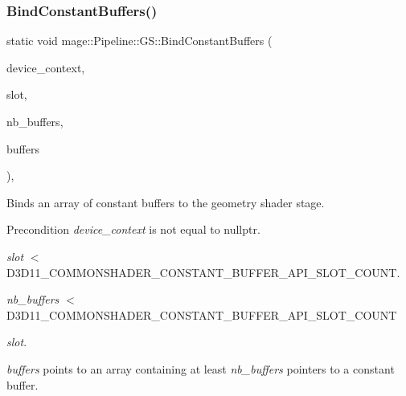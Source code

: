 \subsubsection{\texorpdfstring{Bind\+Constant\+Buffers()}{BindConstantBuffers()}}
{\footnotesize\ttfamily static void mage\+::\+Pipeline\+::\+G\+S\+::\+Bind\+Constant\+Buffers (\begin{DoxyParamCaption}\item[{I\+D3\+D11\+Device\+Context2 $\ast$}]{device\+\_\+context,  }\item[{\hyperlink{namespacemage_af2b398bf98eb10351f49cad73fe2cc73}{u32}}]{slot,  }\item[{\hyperlink{namespacemage_af2b398bf98eb10351f49cad73fe2cc73}{u32}}]{nb\+\_\+buffers,  }\item[{I\+D3\+D11\+Buffer $\ast$const $\ast$}]{buffers }\end{DoxyParamCaption})\hspace{0.3cm}{\ttfamily [static]}, {\ttfamily [noexcept]}}

Binds an array of constant buffers to the geometry shader stage.

\begin{DoxyPrecond}{Precondition}
{\itshape device\+\_\+context} is not equal to {\ttfamily nullptr}. 

{\itshape slot} $<$ {\ttfamily D3\+D11\+\_\+\+C\+O\+M\+M\+O\+N\+S\+H\+A\+D\+E\+R\+\_\+\+C\+O\+N\+S\+T\+A\+N\+T\+\_\+\+B\+U\+F\+F\+E\+R\+\_\+\+A\+P\+I\+\_\+\+S\+L\+O\+T\+\_\+\+C\+O\+U\+NT}. 

{\itshape nb\+\_\+buffers} $<$ {\ttfamily D3\+D11\+\_\+\+C\+O\+M\+M\+O\+N\+S\+H\+A\+D\+E\+R\+\_\+\+C\+O\+N\+S\+T\+A\+N\+T\+\_\+\+B\+U\+F\+F\+E\+R\+\_\+\+A\+P\+I\+\_\+\+S\+L\+O\+T\+\_\+\+C\+O\+U\+NT} 
\begin{DoxyItemize}
\item {\itshape slot}. 
\end{DoxyItemize}

{\itshape buffers} points to an array containing at least {\itshape nb\+\_\+buffers} pointers to a constant buffer. 
\end{DoxyPrecond}

